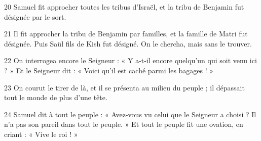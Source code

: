 
20 Samuel fit approcher toutes les tribus d’Israël, et la tribu de Benjamin fut désignée par le sort.

21 Il fit approcher la tribu de Benjamin par familles, et la famille de Matri fut désignée. Puis Saül fils de Kish fut désigné. On le chercha, mais sans le trouver.

22 On interrogea encore le Seigneur : « Y a-t-il encore quelqu’un qui soit venu ici ? » Et le Seigneur dit : « Voici qu’il est caché parmi les bagages ! »

23 On courut le tirer de là, et il se présenta au milieu du peuple ; il dépassait tout le monde de plus d’une tête.

24 Samuel dit à tout le peuple : « Avez-vous vu celui que le Seigneur a choisi ? Il n’a pas son pareil dans tout le peuple. » Et tout le peuple fit une ovation, en criant : « Vive le roi ! »

